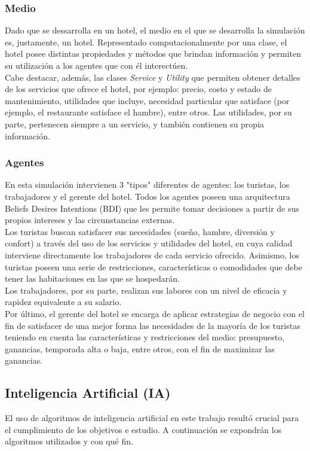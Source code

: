 \documentclass[12pt,a4paper]{article} \usepackage[spanish]{babel} \usepackage{graphicx} \usepackage{amsmath} \usepackage{amsfonts} \usepackage{amssymb} \usepackage{float} \usepackage{geometry}
\begin{document}
\subsubsection{Medio}
Dado que se dessarrolla en un hotel, el medio en el que se desarrolla la simulación es, justamente, un hotel. Representado computacionalmente por una clase, el hotel posee distintas propiedades y métodos que brindan información y permiten su utilización a los agentes que con él interectúen.\\
Cabe destacar, además, las clases \textit{Service} y \textit{Utility} que permiten obtener detalles de los servicios que ofrece el hotel, por ejemplo: precio, costo y estado de mantenimiento, utilidades que incluye, necesidad particular que satisface (por ejemplo, el restaurante satisface el hambre), entre otros. Las utilidades, por su parte, pertenecen siempre a un servicio, y también contienen su propia información.

\subsubsection{Agentes}
En esta simulación intervienen 3 "tipos" diferentes de agentes: los turistas, los trabajadores y el gerente del hotel. Todos los agentes poseen una arquitectura Beliefs Desires Intentions (BDI) que les permite tomar decisiones a partir de sus propios intereses y las circunstancias externas.\\ 
Los turistas buscan satisfacer sus necesidades (sueño, hambre, diversión y confort) a través del uso de los servicios y utilidades del hotel, en cuya calidad interviene directamente los trabajadores de cada servicio ofrecido. Asimismo, los turistas poseen una serie de restricciones, características o comodidades que debe tener las habitaciones en las que se hospedarán.\\
Los trabajadores, por su parte, realizan sus labores con un nivel de eficacia y rapidez equivalente a su salario.\\
Por último, el gerente del hotel se encarga de aplicar estrategias de negocio con el fin de satisfacer de una mejor forma las necesidades de la mayoría de los turistas teniendo en cuenta las características y restricciones del medio: presupuesto, ganancias, temporada alta o baja, entre otros, con el fin de maximizar las ganancias.

\subsection{Inteligencia Artificial (IA)}
El uso de algoritmos de inteligencia artificial en este trabajo resultó crucial para el cumplimiento de los objetivos e estudio. A continuación se expondrán los algoritmos utilizados y con qué fin.
\end{document}
